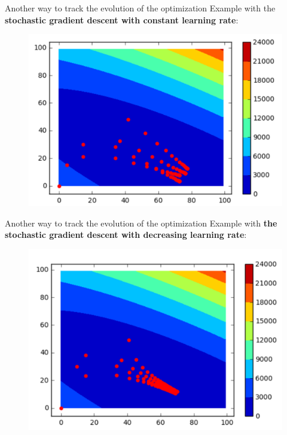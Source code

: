 \documentclass{beamer}
\newcommand{\1}[1]{\mathbbm{1}\left[#1\right]}
\begin{document}
\begin{frame}{Another way to track the evolution of the optimization}
Example with the \textbf{stochastic gradient descent with constant learning rate}:
\begin{figure}
\centering
\includegraphics[width=\linewidth]{images/theta_evolution_sgd_constant_alpha.png}
\end{figure}
\end{frame}

\begin{frame}{Another way to track the evolution of the optimization}
Example with \textbf{the stochastic gradient descent with decreasing learning rate}:
\begin{figure}
\centering
\includegraphics[width=\linewidth]{images/theta_evolution_sgd_decreasing_alpha.png}
\end{figure}
\end{frame}
\end{document}
